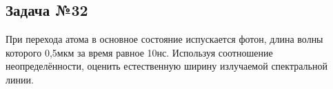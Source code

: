 \subsection{Задача №32}

При перехода атома в основное состояние испускается фотон, длина волны которого 0,5мкм за время равное 10нс. Используя соотношение неопределённости, оценить естественную ширину излучаемой спектральной линии.